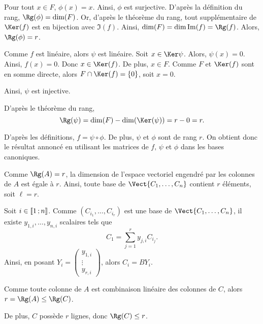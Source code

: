 \begin{solution}
\begin{reponses}
\item
\begin{reponses}
\item Pour tout $x \in F$, $\phi(x) = x$. Ainsi, $\phi$ est surjective. D'après la définition du rang, $\Rg(\phi) = \dim(F)$. Or, d'après le théorème du rang, tout supplémentaire de $\Ker(f)$ est en bijection avec $\Im(f)$. Ainsi, $\dim(F) = \dim \Im(f) = \Rg(f)$. Alors, $\Rg(\phi) = r$.

\item Comme $f$ est linéaire, alors $\psi$ est linéaire. Soit $x \in \Ker\psi$. Alors, $\psi(x) = 0$. Ainsi, $f(x) = 0$. Donc $x \in \Ker(f)$. De plus, $x \in F$. Comme $F$ et $\Ker(f)$ sont en somme directe, alors $F \cap \Ker(f) = \{0\}$, soit $x = 0$.

Ainsi, $\psi$ est injective.

D'après le théorème du rang,
\[
\Rg(\psi)
= \dim(F) - \dim(\Ker(\psi))
= r - 0
= r.
\]

\item D'après les définitions, $f = \psi \circ \phi$. De plus, $\psi$ et $\phi$ sont de rang $r$. On obtient donc le résultat annoncé en utilisant les matrices de $f,\, \psi$ et $\phi$ dans les bases canoniques.
\end{reponses}

\item
\begin{reponses}
\item Comme $\Rg(A) = r$, la dimension de l'espace vectoriel engendré par les colonnes de $A$ est égale à $r$. Ainsi, toute base de $\Vect\{C_1,\ldots,C_n\}$ contient $r$ éléments, soit $\ell = r$.

\item Soit $i \in \llbracket 1\,; n \rrbracket$. Comme $(C_{i_1},\ldots,C_{i_r})$ est une base de $\Vect\{C_1,\ldots,C_n\}$, il existe $y_{1,i},\ldots,y_{n,i}$ scalaires tels que
\[
C_1 = \sum_{j=1}^r y_{j,i} C_{i_j}.
\]
Ainsi, en posant $Y_i = \begin{pmatrix} y_{1,i} \\ \vdots \\ y_{r,i}\end{pmatrix}$, alors $C_i = B Y_i$.

\item Comme toute colonne de $A$ est combinaison linéaire des colonnes de $C$, alors $r = \Rg(A) \leq \Rg(C)$.

De plus, $C$ possède $r$ lignes, donc $\Rg(C) \leq r$.


\end{reponses}
\end{reponses}
\end{solution}
